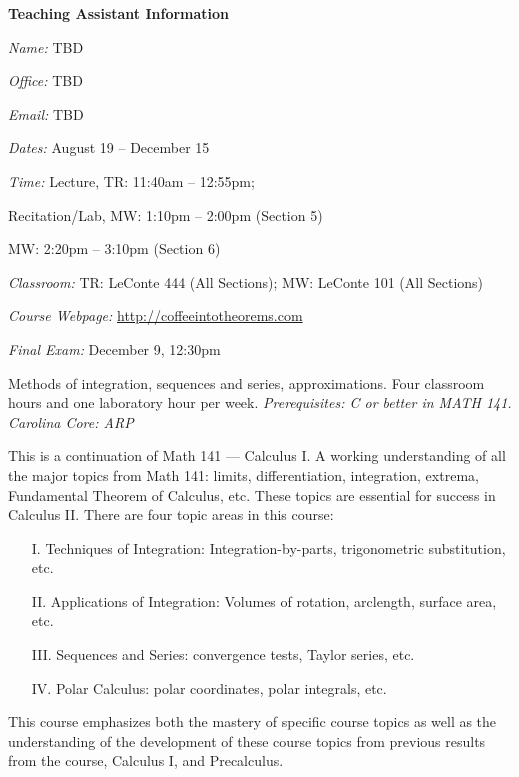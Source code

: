 \documentclass[11pt,letterpaper]{article}
\newcommand{\classdates}{August 19 -- December 15}
\newcommand{\classtimes}{Lecture, TR: 11:40am -- 12:55pm; \par \hspace{0.95cm} Recitation/Lab, MW: 1:10pm -- 2:00pm (Section 5) \par \hspace{3.65cm} MW: 2:20pm -- 3:10pm (Section 6)}
\newcommand{\classroom}{TR: LeConte 444 (All Sections); MW: LeConte 101 (All Sections)}
\newcommand{\website}{http://coffeeintotheorems.com}
\begin{document}
{\bfseries\color{scred} Teaching Assistant Information} \par \vspace{0.1cm}
\hspace{0.25cm} \begin{minipage}[b]{0.4\textwidth}
        \textit{Name:} TBD \par
        \textit{Office:} TBD \par
        \textit{Email:} TBD%
\end{minipage}
\pspace



\textit{Dates:} \classdates \par
\textit{Time:} \classtimes \par
\textit{Classroom:} \classroom \par
\textit{Course Webpage:} \href{\website}{\website} \par
\textit{Final Exam:} December 9, 12:30pm
\sectionbreak




Methods of integration, sequences and series, approximations. Four classroom hours and one laboratory hour per week. {\itshape Prerequisites: C or better in MATH 141. Carolina Core: ARP}
\sectionbreak




This is a continuation of Math 141 --- Calculus I. A working understanding of all the major topics from Math 141: limits, differentiation, integration, extrema, Fundamental Theorem of Calculus, etc. These topics are essential for success in Calculus II. There are four topic areas in this course: \par
	\begin{enumerate}
	\item[I.] Techniques of Integration: Integration-by-parts, trigonometric substitution, etc.
	\item[II.] Applications of Integration: Volumes of rotation, arclength, surface area, etc.
	\item[III.] Sequences and Series: convergence tests, Taylor series, etc.
	\item[IV.] Polar Calculus: polar coordinates, polar integrals, etc.
	\end{enumerate} \par
This course emphasizes both the mastery of specific course topics as well as the understanding of the development of these course topics from previous results from the course, Calculus I, and Precalculus.
\sectionbreak
\end{document}
